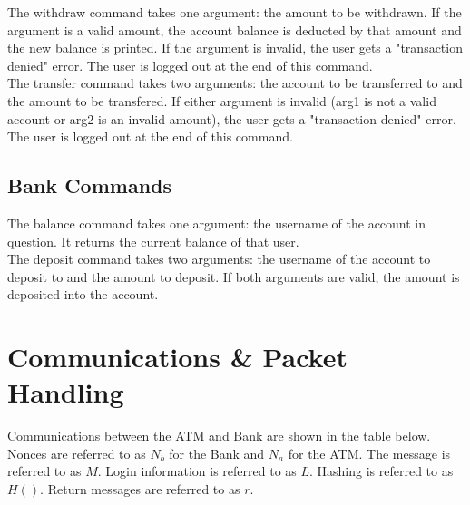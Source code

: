 \documentclass[10pt,a4paper]{article}
\begin{document}
The withdraw command takes one argument: the amount to be withdrawn. If the argument is a valid amount, the account balance is deducted by that amount and the new balance is printed. If the argument is invalid, the user gets a "transaction denied" error. The user is logged out at the end of this command.\\

The transfer command takes two arguments: the account to be transferred to and the amount to be transfered. If either argument is invalid (arg1 is not a valid account or arg2 is an invalid amount), the user gets a "transaction denied" error. The user is logged out at the end of this command.

\subsection{Bank Commands}

The balance command takes one argument: the username of the account in question. It returns the current balance of that user.\\

The deposit command takes two arguments: the username of the account to deposit to and the amount to deposit. If both arguments are valid, the amount is deposited into the account.\\

\section{Communications \& Packet Handling}

Communications between the ATM and Bank are shown in the table below. Nonces are referred to as $N_b$ for the Bank and $N_a$ for the ATM. The message is referred to as $M$. Login information is referred to as $L$. Hashing is referred to as $H()$. Return messages are referred to as $r$.\\
\end{document}
